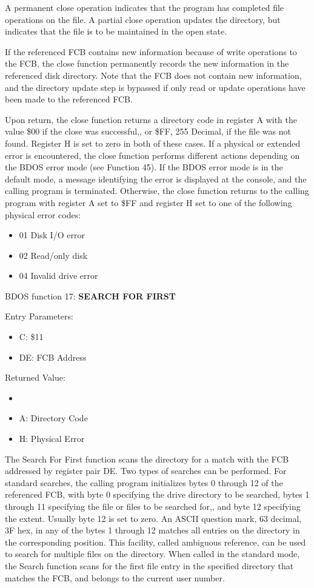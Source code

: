 A permanent close operation indicates that the program has completed
file operations on the file. A partial close operation updates the
directory, but indicates that the file is to be maintained in the open
state.

If the referenced FCB contains new information because of write
operations to the FCB, the close function permanently records the new
information in the referenced disk directory. Note that the FCB does
not contain new information, and the directory update step is
bypassed if only read or update operations have been made to the
referenced FCB.

Upon return, the close function returns a directory code in register A
with the value \$00 if the close was successful,, or \$FF, 255
Decimal, if the file was not found.  Register H is set to zero in both
of these cases. If a physical or extended error is encountered, the
close function performs different actions depending on the BDOS error
mode (see Function 45). If the BDOS error mode is in the default mode,
a message identifying the error is displayed at the console, and the
calling program is terminated. Otherwise, the close function returns
to the calling program with register A set to \$FF and register H set
to one of the following physical error codes:

\begin{itemize}
\item 01 Disk I/O error
\item 02 Read/only disk
\item 04 Invalid drive error
\end{itemize}

BDOS function 17: \textbf{SEARCH FOR FIRST}

Entry Parameters:
\begin{itemize}
\item[] C: \$11
\item[] DE: FCB Address
\end{itemize}

Returned Value:
\begin{itemize}
\item[] \item[] A: Directory Code
\item[] H: Physical Error
\end{itemize}

The Search For First function scans the directory for a match with the
FCB addressed by register pair DE. Two types of searches can be
performed. For standard searches, the calling program initializes
bytes 0 through 12 of the referenced FCB, with byte 0 specifying the
drive directory to be searched, bytes 1 through 11 specifying the file
or files to be searched for,, and byte 12 specifying the
extent. Usually byte 12 is set to zero. An ASCII question mark, 63
decimal, 3F hex, in any of the bytes 1 through 12 matches all entries
on the directory in the corresponding position. This facility, called
ambiguous reference, can be used to search for multiple files on the
directory. When called in the standard mode, the Search function scans
for the first file entry in the specified directory that matches the
FCB, and belongs to the current user number.

